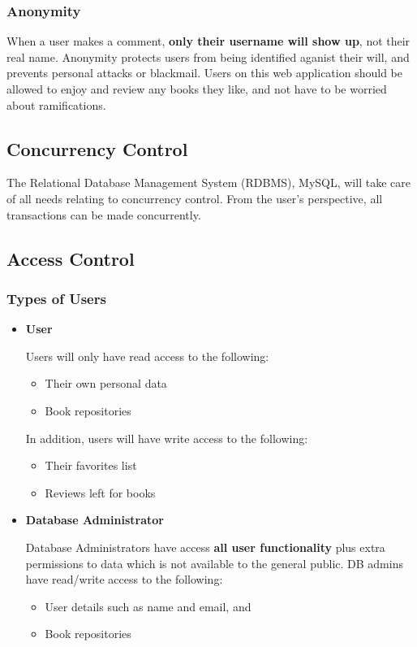 \documentclass[letter, 12pt, titlepage]{article}
\begin{document}
			\subsubsection{Anonymity}
				When a user makes a comment, \textbf{only their username will show up}, not their real name. Anonymity protects users from being identified aganist their will, and prevents personal attacks or blackmail. Users on this web application should be allowed to enjoy and review any books they like, and not have to be worried about ramifications.
		
		\subsection{Concurrency Control}
			The Relational Database Management System (RDBMS), MySQL, will take care of all needs relating to concurrency control. From the user's perspective, all transactions can be made concurrently. 

		\subsection{Access Control}

			\subsubsection{Types of Users}
				\begin{itemize} 
					\item \textbf{User}
						

						Users will only have read access to the following:
						\begin{itemize}
							\item  Their own personal data
							\item  Book repositories
						\end{itemize}


					 In addition, users will have write access to the following:
						\begin{itemize}
							\item  Their favorites list
							\item  Reviews left for books
						\end{itemize}

					\item \textbf{Database Administrator}

						Database Administrators have access \textbf{all user functionality} plus extra permissions to data which is not available to the general public. DB admins have read/write access to the following: 			\begin{itemize}
				\item User details such as name and email, and
				\item Book repositories
		  \end{itemize}
				\end{itemize}
\end{document}
